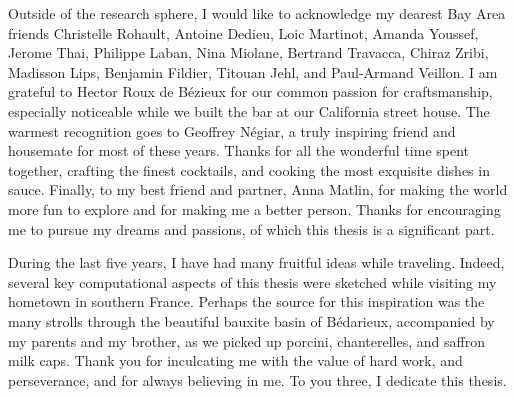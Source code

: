 \begin{acknowledgements}
Outside of the research sphere, I would like to acknowledge my dearest Bay Area friends Christelle Rohault, Antoine Dedieu, Loic Martinot, Amanda Youssef, Jerome Thai, Philippe Laban, Nina Miolane, Bertrand Travacca, Chiraz Zribi, Madisson Lips, Benjamin Fildier,  Titouan Jehl, and Paul-Armand Veillon. I am grateful to Hector Roux de B\'ezieux for our common passion for craftsmanship, especially noticeable while we built the bar at our California street house. The warmest recognition goes to Geoffrey N\'egiar, a truly inspiring friend and housemate for most of these years. Thanks for all the wonderful time spent together, crafting the finest cocktails, and cooking the most exquisite dishes in sauce. Finally, to my best friend and partner, Anna Matlin, for making the world more fun to explore and for making me a better person. Thanks for encouraging me to pursue my dreams and passions, of which this thesis is a significant part.

During the last five years, I have had many fruitful ideas while traveling. Indeed, several
key computational aspects of this thesis were sketched while visiting my hometown in
southern France. Perhaps the source for this inspiration was the many strolls through the
beautiful bauxite basin of B\'edarieux, accompanied by my parents and my brother, as we
picked up porcini, chanterelles, and saffron milk caps. Thank you for inculcating me with
the value of hard work, and perseverance, and for always believing in me. To you three, I
dedicate this thesis.
\end{acknowledgements}